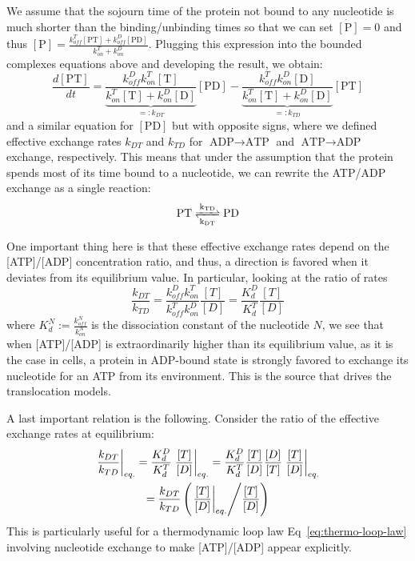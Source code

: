     We assume that the sojourn time of the protein not bound to any nucleotide is much shorter than the binding/unbinding times so that we can set $\dot{[\text{P}]}=0$ and thus $[\text{P}]=\frac{k_{off}^T [\text{PT}] + k_{off}^D [\text{PD}]}{k_{on}^T + k_{on}^D}$. Plugging this expression into the bounded complexes equations above and developing the result, we obtain:
    \begin{equation}
        \frac{d[\text{PT}]}{dt} = 
            \underbrace{\frac{k_{off}^D k_{on}^T [\text{T}]}{k_{on}^T [\text{T}] + k_{on}^D [\text{D}]}}_{=:k_{DT}} [\text{PD}]
            - \underbrace{\frac{k_{off}^T k_{on}^D [\text{D}]}{k_{on}^T [\text{T}] + k_{on}^D [\text{D}]}}_{=:k_{TD}} [\text{PT}]
    \end{equation}
    and a similar equation for $[\text{PD}]$ but with opposite signs, where we defined effective exchange rates $k_{DT}$ and $k_{TD}$ for $\text{ADP}\to\text{ATP}$ and $\text{ATP}\to\text{ADP}$ exchange, respectively. This means that under the assumption that the protein spends most of its time bound to a nucleotide, we can rewrite the ATP/ADP exchange as a single reaction:
    \begin{equation}
        \ce{PT <=>[k_{TD}][k_{DT}] PD}
    \end{equation}
    
    One important thing here is that these effective exchange rates depend on the [ATP]/[ADP] concentration ratio, and thus, a direction is favored when it deviates from its equilibrium value. In particular, looking at the ratio of rates
    \begin{equation}
    \label{eq:kdt-ktd-ratio}
        \frac{k_{DT}}{k_{TD}} 
        = \frac{k_{off}^D k_{on}^T}{k_{off}^T k_{on}^D} \frac{[T]}{[D]}
        = \frac{K_d^D}{K_d^T} \frac{[T]}{[D]}
    \end{equation}
    where $K_d^N:=\frac{k_{off}^N}{k_{on}^N}$ is the dissociation constant of the nucleotide $N$, we see that when [ATP]/[ADP] is extraordinarily higher than its equilibrium value, as it is the case in cells, a protein in ADP-bound state is strongly favored to exchange its nucleotide for an ATP from its environment. This is the source that drives the translocation models.
    
    A last important relation is the following. Consider the ratio of the effective exchange rates at equilibrium:
    \begin{multline}
    \label{eq:equil-kdt-ktd-ratio}
        \left.\frac{k_{DT}}{k_{TD}}\right|_{eq.}
        = \frac{K_d^D}{K_d^T} \left.\frac{[T]}{[D]}\right|_{eq.}
        = \frac{K_d^D}{K_d^T} \frac{[T]}{[D]} \frac{[D]}{[T]} \left.\frac{[T]}{[D]}\right|_{eq.} \\
        = \frac{k_{DT}}{k_{TD}} \left(\left.\frac{[T]}{[D]}\right|_{eq.} \middle/ \frac{[T]}{[D]}\right)
    \end{multline}
    This is particularly useful for a thermodynamic loop law Eq~\eqref{eq:thermo-loop-law} involving nucleotide exchange to make [ATP]/[ADP] appear explicitly.

